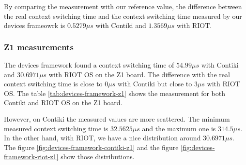 By comparing the measurement with our reference value, the difference between the real context switching time and the context switching time measured by our devices frameowrk is $0.5279\mu s$ with Contiki and $1.3569\mu s$ with RIOT.

\subsubsection{Z1 measurements}
The devices framework found a context switching time of $54.99\mu s$ with Contiki and $30.6971\mu s$ with RIOT OS on the Z1 board.
The difference with the real context switching time is close to $0\mu s$ with Contiki but close to $3\mu s$ with RIOT OS.
The table \ref{tab:devices-framework-z1} shows the measurement for both Contiki and RIOT OS on the Z1 board.



However, on Contiki the measured values are more scattered.
The minimum measured context switching time is $32.5625\mu s$ and the maximum one is $314.5\mu s$.
In the other hand, with RIOT, we have a nice distribution around $30.6971\mu s$.
The figure \ref{fig:devices-framework-contiki-z1} and the figure \ref{fig:devices-framework-riot-z1} show those distributions.

